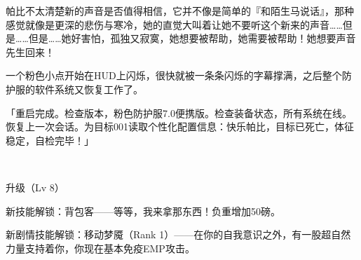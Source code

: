 
帕比不太清楚新的声音是否值得相信，它并不像是简单的『和陌生马说话』，那种感觉就像是更深的悲伤与寒冷，她的直觉大叫着让她不要听这个新来的声音……但是……但是……她好害怕，孤独又寂寞，她想要被帮助，她需要被帮助！她想要声音先生回来！


一个粉色小点开始在HUD上闪烁，很快就被一条条闪烁的字幕撑满，之后整个防护服的软件系统又恢复工作了。

「{\mt 重启完成。检查版本，粉色防护服7.0便携版。检查装备状态，所有系统在线。恢复上一次会话。为目标001读取个性化配置信息：快乐帕比，目标已死亡，体征稳定，自检完毕！}」

~\vfill

\begin{note}
    升级（Lv 8）

    新技能解锁：背包客——等等，我来拿那东西！负重增加50磅。

    新剧情技能解锁：移动梦魇（Rank 1）——在你的自我意识之外，有一股超自然力量支持着你，你现在基本免疫EMP攻击。
\end{note}


